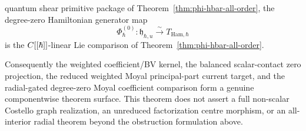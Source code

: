 \documentclass[11pt]{memoir}
\begin{document}
\begin{thm}
\begin{enumerate}
      quantum shear primitive package of
      Theorem~\ref{thm:phi-hbar-all-order}, the degree-zero
      Hamiltonian generator map
      \[
        \Phi_\hbar^{(0)}\colon
        \mathfrak h_{\hbar,u}\xrightarrow{\sim}T_{\mathrm{Ham},\hbar}
      \]
      is the \(C[[\hbar]]\)-linear Lie comparison of
      Theorem~\ref{thm:phi-hbar-all-order}.
  \end{enumerate}
  Consequently the weighted coefficient/BV kernel, the balanced
  scalar-contact zero projection, the reduced weighted Moyal
  principal-part current target, and the radial-gated degree-zero Moyal
  coefficient comparison form a genuine componentwise theorem surface.
  This theorem does not assert a full non-scalar Costello graph
  realization, an unreduced factorization centre morphism, or an
  all-interior radial theorem beyond the obstruction formulation above.
\end{thm}
\end{document}
